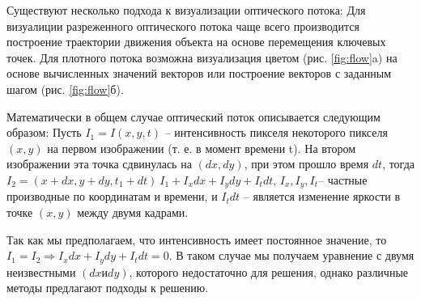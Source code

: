 \documentclass[times]{itmo-student-thesis}
\begin{document}
Существуют несколько подхода к визуализации оптического потока:
Для визуалиции разреженного оптического потока чаще всего производится построение траектории движения объекта на основе перемещения ключевых точек. Для плотного потока возможна визуализация цветом (рис. \ref{fig:flow}a) на основе вычисленных значений векторов или построение векторов с заданным шагом  (рис. \ref{fig:flow}б). 

Математически в общем случае оптический поток описывается следующим образом:
Пусть  $I_1 = I(x, y, t)$ – интенсивность пикселя некоторого пикселя $(x, y)$ на первом изображении (т. е. в момент времени t). На втором изображении эта точка сдвинулась на $(dx, dy)$, при этом прошло время $dt$, тогда $I_2 = (x+dx, y+dy, t_1+dt) ~ I_1 + I_xdx +I_ydy+I_tdt$, $I_{x},I_{y},I_{t} $– частные производные по координатам и времени, и $I_{t}dt$ – является изменение яркости в точке $(x, y)$  между двумя кадрами.

Так как мы предполагаем, что интенсивность имеет постоянное значение, то $I_{1}=I_{2}\Rightarrow  I_xdx +I_ydy+I_tdt = 0$. В таком случае мы получаем уравнение с двумя неизвестными $(dx и dy)$, которого недостаточно для решения, однако различные методы предлагают подходы к решению.
\end{document}
